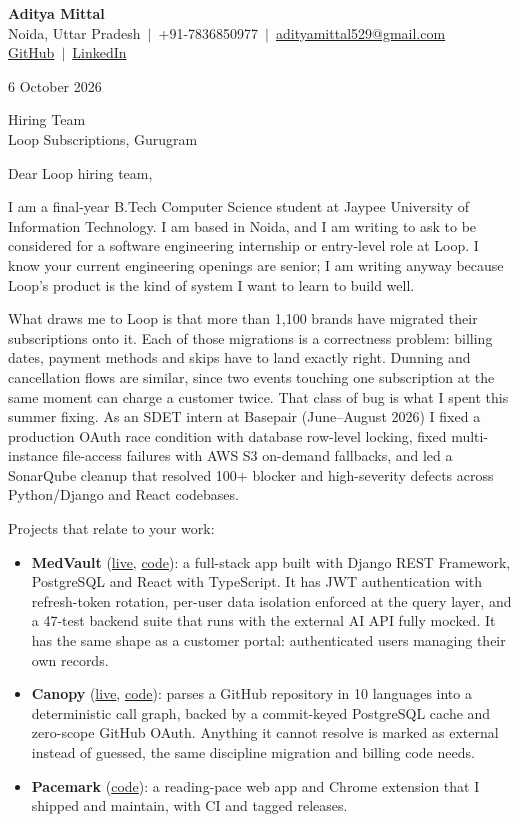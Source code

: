 \documentclass[11pt]{article}
\begin{document}
{\Large \textbf{Aditya Mittal}}\\[2pt]
Noida, Uttar Pradesh \,$|$\, +91-7836850977 \,$|$\, \href{mailto:adityamittal529@gmail.com}{adityamittal529@gmail.com}\\
\href{https://github.com/adityamittal-dot}{GitHub} \,$|$\, \href{https://www.linkedin.com/in/aditya-mittal-084b91291/}{LinkedIn}

6 October 2026

Hiring Team\\
Loop Subscriptions, Gurugram

Dear Loop hiring team,

I am a final-year B.Tech Computer Science student at Jaypee University of Information Technology. I am based in Noida, and I am writing to ask to be considered for a software engineering internship or entry-level role at Loop. I know your current engineering openings are senior; I am writing anyway because Loop's product is the kind of system I want to learn to build well.

What draws me to Loop is that more than 1,100 brands have migrated their subscriptions onto it. Each of those migrations is a correctness problem: billing dates, payment methods and skips have to land exactly right. Dunning and cancellation flows are similar, since two events touching one subscription at the same moment can charge a customer twice. That class of bug is what I spent this summer fixing. As an SDET intern at Basepair (June--August 2026) I fixed a production OAuth race condition with database row-level locking, fixed multi-instance file-access failures with AWS S3 on-demand fallbacks, and led a SonarQube cleanup that resolved 100+ blocker and high-severity defects across Python/Django and React codebases.

Projects that relate to your work:
\begin{itemize}[leftmargin=1.2em,itemsep=3pt,topsep=0pt]
\item \textbf{MedVault} (\href{https://medvault-xor.vercel.app}{live}, \href{https://github.com/adityamittal-dot/XOR}{code}): a full-stack app built with Django REST Framework, PostgreSQL and React with TypeScript. It has JWT authentication with refresh-token rotation, per-user data isolation enforced at the query layer, and a 47-test backend suite that runs with the external AI API fully mocked. It has the same shape as a customer portal: authenticated users managing their own records.
\item \textbf{Canopy} (\href{https://canopy-v7hb.onrender.com}{live}, \href{https://github.com/adityamittal-dot/Canopy}{code}): parses a GitHub repository in 10 languages into a deterministic call graph, backed by a commit-keyed PostgreSQL cache and zero-scope GitHub OAuth. Anything it cannot resolve is marked as external instead of guessed, the same discipline migration and billing code needs.
\item \textbf{Pacemark} (\href{https://github.com/adityamittal-dot/pacemark}{code}): a reading-pace web app and Chrome extension that I shipped and maintain, with CI and tagged releases.
\end{itemize}
\end{document}
